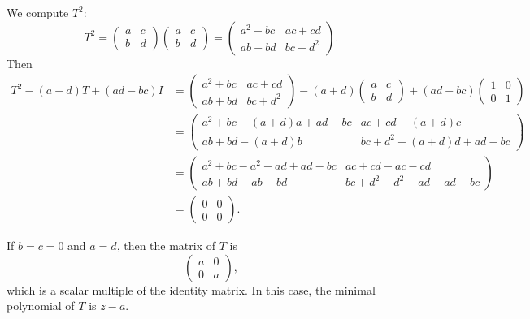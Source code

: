 \begin{solenum}
    \item We compute $T^2$:
    \[
        T^2 = 
        \begin{pmatrix}
            a & c \\
            b & d
        \end{pmatrix}
        \begin{pmatrix}
            a & c \\
            b & d
        \end{pmatrix}
        =
        \begin{pmatrix}
            a^2 + bc & ac + cd \\
            ab + bd & bc + d^2
        \end{pmatrix}.
    \]
    Then 
    \begin{align*}
        T^2 - (a + d)T + (ad - bc)I &= 
        \begin{pmatrix}
            a^2 + bc & ac + cd \\
            ab + bd & bc + d^2
        \end{pmatrix}
        - (a + d)
        \begin{pmatrix}
            a & c \\
            b & d
        \end{pmatrix}
        + (ad - bc)
        \begin{pmatrix}
            1 & 0 \\
            0 & 1
        \end{pmatrix} \\
        &= 
        \begin{pmatrix}
            a^2 + bc - (a + d)a + ad - bc & ac + cd - (a + d)c \\
            ab + bd - (a + d)b & bc + d^2 - (a + d)d + ad - bc
        \end{pmatrix} \\
        &=
        \begin{pmatrix}
            a^2 + bc - a^2 - ad + ad - bc & ac + cd - ac - cd \\
            ab + bd - ab - bd & bc + d^2 - d^2 - ad + ad - bc
        \end{pmatrix} \\
        &= 
        \begin{pmatrix}
            0 & 0 \\
            0 & 0
        \end{pmatrix}.
    \end{align*}
    \item If $b = c = 0$ and $a = d$, then the matrix of $T$ is
    \[
        \begin{pmatrix}
            a & 0 \\ 
            0 & a 
        \end{pmatrix},
    \]
    which is a scalar multiple of the identity matrix.
    In this case, the minimal polynomial of $T$ is $z - a$.


\end{solenum}
